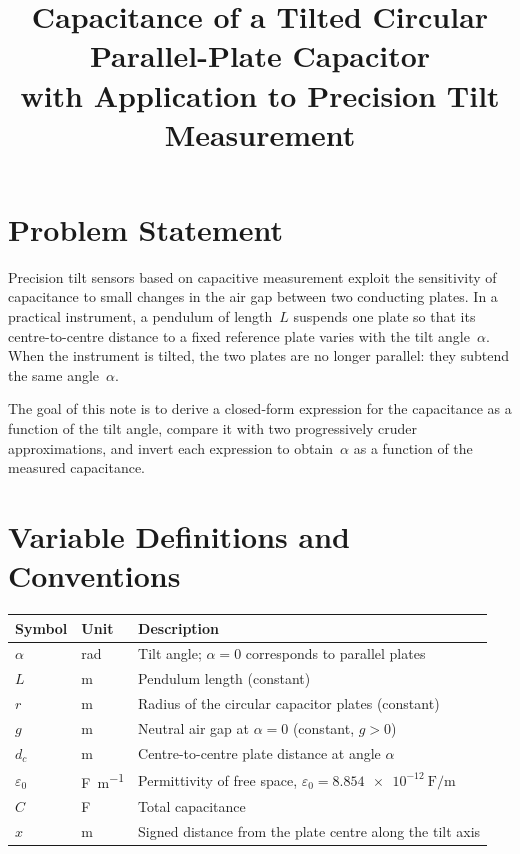 \documentclass[11pt,a4paper]{article}
\title{Capacitance of a Tilted Circular Parallel-Plate Capacitor\\
       with Application to Precision Tilt Measurement}
\author{}
\date{}
\begin{document}
\maketitle
\tableofcontents
\bigskip

\section{Problem Statement}

Precision tilt sensors based on capacitive measurement exploit the
sensitivity of capacitance to small changes in the air gap between two
conducting plates.  In a practical instrument, a pendulum of length~$L$
suspends one plate so that its centre-to-centre distance to a fixed
reference plate varies with the tilt angle~$\alpha$.  When the
instrument is tilted, the two plates are no longer parallel: they subtend
the same angle~$\alpha$.

The goal of this note is to derive a closed-form expression for the
capacitance as a function of the tilt angle, compare it with two
progressively cruder approximations, and invert each expression to
obtain~$\alpha$ as a function of the measured capacitance.

\section{Variable Definitions and Conventions}

\begin{center}
\begin{tabular}{@{}lll@{}}
\toprule
Symbol & Unit & Description \\
\midrule
$\alpha$ & \si{\radian} & Tilt angle; $\alpha = 0$ corresponds to parallel plates \\
$L$      & \si{\metre}  & Pendulum length (constant) \\
$r$      & \si{\metre}  & Radius of the circular capacitor plates (constant) \\
$g$      & \si{\metre}  & Neutral air gap at $\alpha = 0$ (constant, $g > 0$) \\
$d_c$    & \si{\metre}  & Centre-to-centre plate distance at angle $\alpha$ \\
$\varepsilon_0$ & \si{\farad\per\metre} & Permittivity of free space,
                  $\varepsilon_0 = \SI{8.854e-12}{\farad\per\metre}$ \\
$C$      & \si{\farad}  & Total capacitance \\
$x$      & \si{\metre}  & Signed distance from the plate centre along the tilt axis \\
\bottomrule
\end{tabular}
\end{center}
\end{document}
